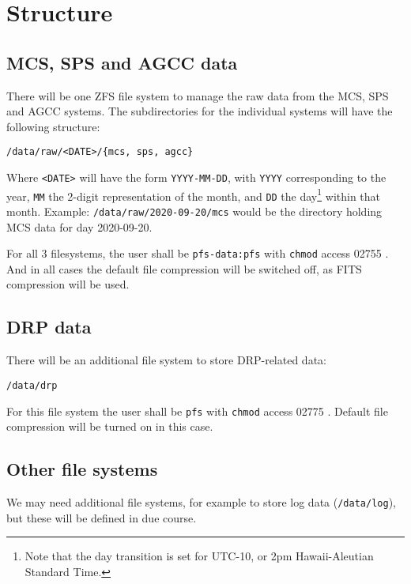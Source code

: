 \section{Structure}

\subsection{MCS, SPS and AGCC data}

There will be one ZFS file system to manage the raw data from the MCS, SPS and AGCC systems.
The subdirectories for the individual systems will have the following structure:

\begin{verbatim}
/data/raw/<DATE>/{mcs, sps, agcc}
\end{verbatim}

Where \verb!<DATE>! will have the form \verb!YYYY-MM-DD!, with \verb!YYYY! corresponding to the year,
\verb!MM! the 2-digit representation of the month, and \verb!DD! the day\footnote{Note that 
the day transition is set for UTC-10, or 2pm Hawaii-Aleutian Standard Time.} within that month. 
Example: \verb!/data/raw/2020-09-20/mcs! would be the directory holding MCS data for day 2020-09-20.

For all 3 filesystems, the user shall be \verb!pfs-data:pfs! with \verb!chmod! access 02755 . 
And in all cases the default file compression will be switched off, as FITS compression will be used.  

\subsection{DRP data}

There will be an additional file system to store DRP-related data:

\begin{verbatim}
/data/drp 
\end{verbatim}

For this file system the user shall be \verb!pfs! with \verb!chmod! access 02775 . 
Default file compression will be turned on in this case.


\subsection{Other file systems}

We may need additional file systems, for example to store log data (\verb!/data/log!), but these will be defined
in due course.
